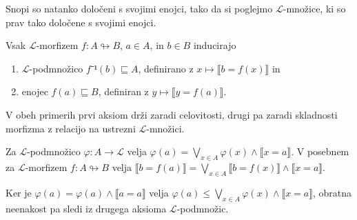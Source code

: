 Snopi so natanko določeni s svojimi enojci, tako da si poglejmo \(ℒ\)-množice,
ki so prav tako določene s svojimi enojci.

\begin{lema}\label{lem:image}
  Vsak \(ℒ\)-morfizem \(f : A ↬ B\), \(a ∈ A\), in \(b ∈ B\) inducirajo
  \begin{enumerate}
  \item \(ℒ\)-podmnožico \(f⁻¹(b) ⊑ A\), definirano z \(x ↦ ⟦b = f(x)⟧\) in
  \item enojec \(f(a) ⊑ B\), definiran z \(y ↦ ⟦y = f(a)⟧\).
  \end{enumerate}
\end{lema}
\begin{dokaz}
  V obeh primerih prvi aksiom drži zaradi celovitosti, drugi pa zaradi
  skladnosti morfizma z relacijo na ustrezni \(ℒ\)-množici.
\end{dokaz}

\begin{lema}\label{lem:subst}
  Za \(ℒ\)-podmnožico \(φ : A → ℒ\) velja \({φ(a) = ⋁_{x ∈ A} φ(x)∧⟦x = a⟧}\).
  V posebnem za \(ℒ\)-morfizem \(f : A ↬ B\) velja \(⟦b = f(a)⟧ = ⋁_{x ∈ A} ⟦b = f(x)⟧∧⟦x = a⟧\).
\end{lema}
\begin{dokaz}
  Ker je \({φ(a) = φ(a)∧⟦a = a⟧}\) velja \( φ(a) ≤ ⋁_{x ∈ A} φ(x)∧⟦x = a⟧\),
  obratna neenakost pa sledi iz drugega aksioma \(ℒ\)-podmnožic.
\end{dokaz}

